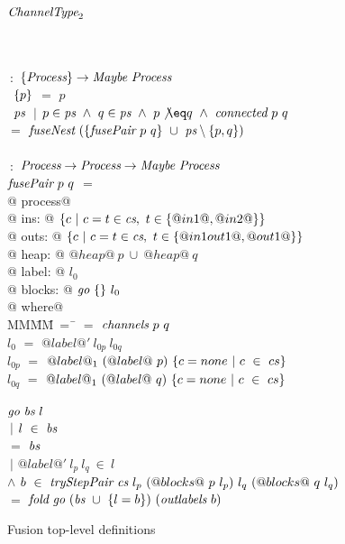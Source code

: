 \begin{figure}

\begin{tabbing}
$\textit{ChannelType}_2$   \TABDEF \kill

 \\
\\
 \> $~:$ \> $\{ \textit{Process} \} \to  \textit{Maybe}~\textit{Process}$ \\
~$\{ p \}$ \> $=$ \> $p$ \\
~$\textit{ps}$
    \> $~|$      \> $p \in \ti{ps} ~\wedge~ q \in \ti{ps} ~\wedge~ p \not\eq q ~\wedge~ \ti{connected}~p~q$ \\
    \> $=$ \> $\textit{fuseNest}~(\{ \textit{fusePair}~p~q \}~\cup~\textit{ps} \setminus \{ p,q \})$ \\
\\
 \> $~:$ \> $\textit{Process} \to \textit{Process} \to  \textit{Maybe}~\textit{Process}$ \\
$\textit{fusePair}~p~q$ \> $=$ \\
@    process@ \\
@        ins: @ $\{ c~|~c=t \in \textit{cs},~t \in \{ @in1@,@in2@ \} \} $ \\
@       outs: @ $\{ c~|~c=t \in \textit{cs},~t \in \{ @in1out1@,@out1@ \} \} $ \\
@       heap: @ $@heap@~p~\cup~@heap@~q$ \\
@      label: @ $l_0$ \\
@     blocks: @ $\textit{go}~\{  \}~l_0$ \\
@ where@ \\
MM\=MM\=~=~\=\kill
 \> \cs \> $=$ \> $\textit{channels}~p~q$ \\
 \> $l_0$   \> $=$ \> $@label@'~l_{0p}~l_{0q}$ \\
 \> $l_{0p}$   \> $=$ \> $@label@_1~(@label@~p)~\{ c=none~|~c~\in~cs \}$ \\
 \> $l_{0q}$   \> $=$ \> $@label@_1~(@label@~q)~\{ c=none~|~c~\in~cs \}$ \\
 \\
 \> $\textit{go}~\textit{bs}~l$ \\
 \> \> $~|$ \> $l~\in~\textit{bs}$ \\
 \> \> $=$  \> $\textit{bs}$ \\
 \> \> $~|$     \> $@label@'~l_p~l_q~\in~l$ \\
 \> \> $\wedge$ \>
        $b~\in~\textit{tryStepPair}~\textit{cs}~l_p~(@blocks@~p~l_p)~l_q~(@blocks@~q~l_q)$ \\ 
 \> \> $=$ \> $\textit{fold}~\textit{go}~(\textit{bs}~\cup~\{ l=b \})~(\textit{outlabels}~b)$ \\
\end{tabbing}
\caption{Fusion top-level definitions}
\label{fig:Fusion:Def:Top}
\end{figure}


